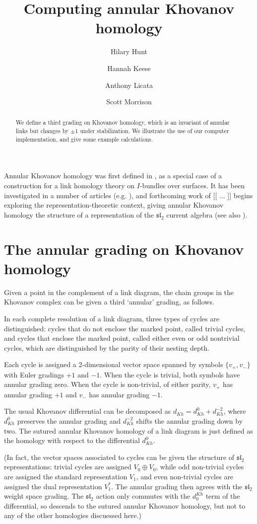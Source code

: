 \documentclass{amsart}
\title{Computing annular Khovanov homology}
\author{Hilary Hunt}
\author{Hannah Keese}
\author{Anthony Licata}
\author{Scott Morrison}
\theoremstyle{plain}
\newcommand{\nn}[1]{{\color{red} [[ #1 ]]}}
\newcommand{\fsl}{\mathfrak{sl}_2}
\begin{document}
\begin{abstract}
We define a third grading on Khovanov homology, which is an invariant of annular links but changes by $\pm 1$ under stabilization. We illustrate the use of our computer implementation, and give some example calculations.
\end{abstract}

\maketitle


Annular Khovanov homology was first defined in \cite{MR2113902}, as a special case of a construction for a link homology theory on $I$-bundles over surfaces. It has been investigated in a number of articles (e.g. \cite{MR2728482, MR3147412, MR2866927, 1212.2222, 1303.1986, 1305.2183}), and forthcoming work of \nn{ ... } begins exploring the representation-theoretic context, giving annular Khovanov homology the structure of a representation of the $\mathfrak{sl}_2$ current algebra (see also \cite{KeeseThesis}).


\section{The annular grading on Khovanov homology}
Given a point in the complement of a link diagram, the chain groups in the Khovanov complex can be given a third `annular' grading, as follows.

In each complete resolution of a link diagram, three types of cycles are distinguished: cycles that do not enclose the marked point, called trivial cycles, and cycles that enclose the marked point, called either even or odd nontrivial cycles, which are distinguished by the parity of their nesting depth.

Each cycle is assigned a 2-dimensional vector space spanned by symbols $\{v_+, v_-\}$ with Euler gradings $+1$ and $-1$. When the cycle is trivial, both symbols have annular grading zero. When the cycle is non-trivial, of either parity, $v_+$ has annular grading $+1$ and $v_-$ has annular grading $-1$.

The usual Khovanov differential can be decomposed as $d_{Kh}=d_{Kh}^0+d_{Kh}^{-2}$, where $d_{Kh}^0$ preserves the annular grading and $d_{Kh}^{-2}$ shifts the annular grading down by two. The  sutured annular Khovanov homology of a link diagram is just defined as the homology with respect to the differential $d_{Kh}^0$.

(In fact, the vector spaces associated to cycles can be given the structure of $\fsl$ representations: trivial cycles are assigned $V_0 \oplus V_0$, while odd non-trivial cycles are assigned the standard representation $V_1$, and even non-trivial cycles are assigned the dual representation $V_1^*$. The annular grading then agrees with the $\fsl$ weight space grading. The $\fsl$ action only commutes with the $d^{Kh}_0$ term of the differential, so descends to the sutured annular Khovanov homology, but not to any of the other homologies discuessed here.)
\end{document}

